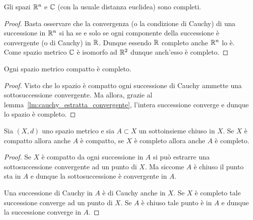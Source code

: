 \begin{corollary}[completezza di $\RR^n$ e $\CC$]
Gli spazi $\RR^n$ e $\CC$ (con la usuale distanza euclidea)
sono completi.
\end{corollary}
%
\begin{proof}
Basta osservare che la convergenza (o la condizione di Cauchy) di una successione in $\RR^n$
si ha se e solo se ogni componente della successione è convergente (o di Cauchy) in ${\mathbb R}$. 
Dunque essendo ${\mathbb R}$ completo anche $\RR^n$ lo è. 
Come spazio metrico $\CC$ è isomorfo ad ${\mathbb R}^2$ dunque anch'esso è completo.
\end{proof}

\begin{theorem}
Ogni spazio metrico compatto è completo.
\end{theorem}
%
\begin{proof}
Visto che lo spazio è compatto ogni successione di Cauchy
ammette una sottosuccessione convergente.
Ma allora, grazie al lemma~\ref{lm:cauchy_estratta_convergente},
l'intera successione converge e dunque lo spazio è completo.
\end{proof}

\begin{theorem}%
\label{th:chiuso_completo}%
\label{th:compatto_completo}%
Sia $(X,d)$ uno spazio metrico e sia $A\subset X$ un sottoinsieme chiuso in $X$. Se $X$ è compatto allora anche $A$ è compatto, se $X$ è completo allora anche $A$ è completo.
\end{theorem}
\begin{proof}
Se $X$ è compatto da ogni successione in $A$ si può estrarre una sottosuccessione convergente ad un punto di $X$. 
Ma siccome $A$ è chiuso il punto sta in $A$ e dunque la sottosuccessione è convergente in $A$.

Una successione di Cauchy in $A$ è di Cauchy anche in $X$. 
Se $X$ è completo tale successione converge ad un punto di $X$. 
Se $A$ è chiuso tale punto è in $A$ e dunque la successione converge in $A$.
\end{proof}


